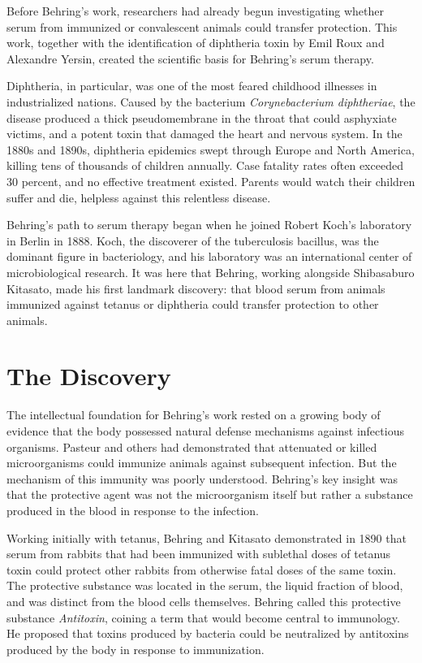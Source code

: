 Before Behring's work, researchers had already begun investigating whether serum from immunized or convalescent animals could transfer protection. This work, together with the identification of diphtheria toxin by Emil Roux and Alexandre Yersin, created the scientific basis for Behring's serum therapy.\cite{nobel-1901,nobel-history}

Diphtheria, in particular, was one of the most feared childhood illnesses in industrialized nations. Caused by the bacterium \emph{Corynebacterium diphtheriae}, the disease produced a thick pseudomembrane in the throat that could asphyxiate victims, and a potent toxin that damaged the heart and nervous system. In the 1880s and 1890s, diphtheria epidemics swept through Europe and North America, killing tens of thousands of children annually. Case fatality rates often exceeded 30 percent, and no effective treatment existed. Parents would watch their children suffer and die, helpless against this relentless disease.

Behring's path to serum therapy began when he joined Robert Koch's laboratory in Berlin in 1888. Koch, the discoverer of the tuberculosis bacillus, was the dominant figure in bacteriology, and his laboratory was an international center of microbiological research. It was here that Behring, working alongside Shibasaburo Kitasato, made his first landmark discovery: that blood serum from animals immunized against tetanus or diphtheria could transfer protection to other animals.\cite{nobel-history,nobel-1901}

\section{The Discovery}

The intellectual foundation for Behring's work rested on a growing body of evidence that the body possessed natural defense mechanisms against infectious organisms. Pasteur and others had demonstrated that attenuated or killed microorganisms could immunize animals against subsequent infection. But the mechanism of this immunity was poorly understood. Behring's key insight was that the protective agent was not the microorganism itself but rather a substance produced in the blood in response to the infection.

Working initially with tetanus, Behring and Kitasato demonstrated in 1890 that serum from rabbits that had been immunized with sublethal doses of tetanus toxin could protect other rabbits from otherwise fatal doses of the same toxin. The protective substance was located in the serum, the liquid fraction of blood, and was distinct from the blood cells themselves. Behring called this protective substance \emph{Antitoxin}, coining a term that would become central to immunology. He proposed that toxins produced by bacteria could be neutralized by antitoxins produced by the body in response to immunization.

